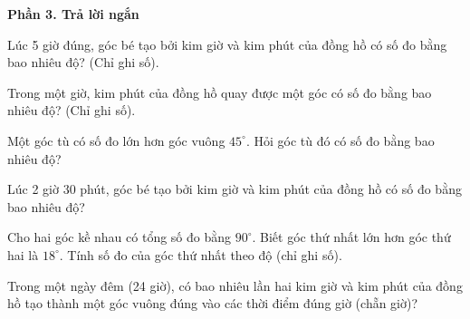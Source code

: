 \textbf{Phần 3. Trả lời ngắn}

\begin{ex} %
Lúc 5 giờ đúng, góc bé tạo bởi kim giờ và kim phút của đồng hồ có số đo bằng bao nhiêu độ? (Chỉ ghi số).
\end{ex}

\begin{ex} %
Trong một giờ, kim phút của đồng hồ quay được một góc có số đo bằng bao nhiêu độ? (Chỉ ghi số).
\end{ex}

\begin{ex} %
Một góc tù có số đo lớn hơn góc vuông $45^\circ$. Hỏi góc tù đó có số đo bằng bao nhiêu độ?
\end{ex}

\begin{ex} %
Lúc 2 giờ 30 phút, góc bé tạo bởi kim giờ và kim phút của đồng hồ có số đo bằng bao nhiêu độ?
\end{ex}

\begin{ex} %
Cho hai góc kề nhau có tổng số đo bằng $90^\circ$. Biết góc thứ nhất lớn hơn góc thứ hai là $18^\circ$. Tính số đo của góc thứ nhất theo độ (chỉ ghi số).
\end{ex}

\begin{ex} %
Trong một ngày đêm (24 giờ), có bao nhiêu lần hai kim giờ và kim phút của đồng hồ tạo thành một góc vuông đúng vào các thời điểm đúng giờ (chẵn giờ)?
\end{ex}

